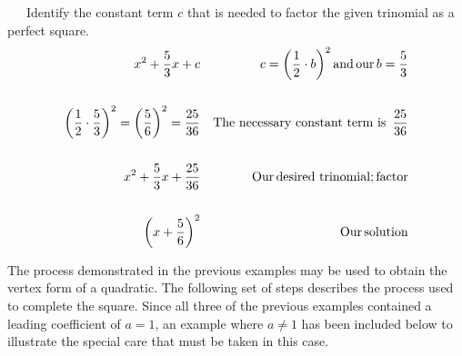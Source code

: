 \begin{example}~~~Identify the constant term $c$ that is needed to factor the given trinomial as a perfect square.
  \begin{eqnarray*}
    x^2 + \frac{5}{3} x + c &  & c = \left( \frac{1}{2} \cdot b \right)^2
    \operatorname{and} \operatorname{our} b = \frac{5}{3}\\
    &  & \\
    \left( \frac{1}{2} \cdot \frac{5}{3} \right)^2 = \left( \frac{5}{6}
    \right)^2 = \frac{25}{36} &  & \operatorname{The~necessary~constant~term~is~}
    \frac{25}{36}\\
    &  & \\
    x^2 + \frac{5}{3} x + \frac{25}{36} &  & \operatorname{Our} \operatorname{desired~trinomial}; \operatorname{factor}\\
    &  & \\
    \left( x + \frac{5}{6} \right)^2 &  & \operatorname{Our} \operatorname{solution}
  \end{eqnarray*}
\end{example}

The process demonstrated in the previous examples may be used to obtain the vertex form of a quadratic. The following set of steps describes the process used to complete the square.  Since all three of the previous examples contained a leading coefficient of $a=1$, an example where $a\neq 1$ has been included below to illustrate the special care that must be taken in this case.\pp 


